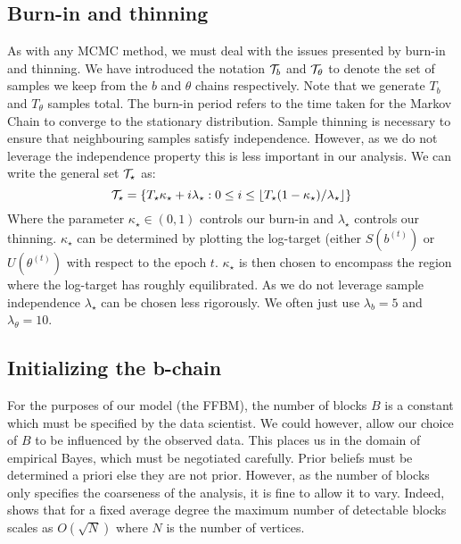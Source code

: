 \subsection{Burn-in and thinning}
\label{appdx:burn-in-thinning}

As with any MCMC method, we must deal with the issues presented by burn-in and thinning. We have introduced the notation $\mathcal{T}_b$ and $\mathcal{T}_\theta$ to denote the set of samples we keep from the $b$ and $\theta$ chains respectively. Note that we generate $T_b$ and $T_\theta$ samples total. The burn-in period refers to the time taken for the Markov Chain to converge to the stationary distribution. Sample thinning is necessary to ensure that neighbouring samples satisfy independence. However, as we do not leverage the independence property this is less important in our analysis. We can write the general set $\mathcal{T}_\star$ as:
%
\begin{equation}
	\mathcal{T}_\star = \{T_\star \kappa_\star + i \lambda_\star :  
	0 \leq i \leq \lfloor T_\star(1 - \kappa_\star) / \lambda_\star \rfloor \}
\end{equation}
%
Where the parameter $\kappa_\star \in (0, 1)$ controls our burn-in and $\lambda_\star$ controls our thinning. $\kappa_\star$ can be determined by plotting the log-target (either $S(b^{(t)})$ or $U(\theta^{(t)})$ with respect to the epoch $t$. $\kappa_\star$ is then chosen to encompass the region where the log-target has roughly equilibrated. As we do not leverage sample independence $\lambda_\star$ can be chosen less rigorously. We often just use $\lambda_b=5$ and $\lambda_\theta = 10$.

\subsection{Initializing the b-chain}

For the purposes of our model (the FFBM), the number of blocks $B$ is a constant which must be specified by the data scientist. We could however, allow our choice of $B$ to be influenced by the observed data. This places us in the domain of empirical Bayes, which must be negotiated carefully. Prior beliefs must be determined a priori else they are not prior. However, as the number of blocks only specifies the coarseness of the analysis, it is fine to allow it to vary. Indeed, \citet{peixoto-determine-B} shows that for a fixed average degree the maximum number of detectable blocks scales as $O(\sqrt{N})$ where $N$ is the number of vertices.

